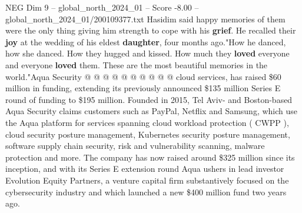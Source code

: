 \begin{textsample}{NEG Dim 9 – global\_north\_2024\_01 – Score -8.00 – global\_north\_2024\_01/200109377.txt}
Hasidim said happy memories of them were the only thing giving him strength to cope with his \textbf{grief}.
He recalled their \textbf{joy} at the wedding of his eldest \textbf{daughter}, four months ago."How he danced, how she danced.
How they hugged and kissed.
How much they \textbf{loved} everyone and everyone \textbf{loved} them.
These are the most beautiful memories in the world."Aqua Security @ @ @ @ @ @ @ @ @ @ cloud services, has raised \$60 million in funding, extending its previously announced \$135 million Series E round of funding to \$195 million.
Founded in 2015, Tel Aviv- and Boston-based Aqua Security claims customers such as PayPal, Netflix and Samsung, which use the Aqua platform for services spanning cloud workload protection ( CWPP ), cloud security posture management, Kubernetes security posture management, software supply chain security, risk and vulnerability scanning, malware protection and more.
The company has now raised around \$325 million since its inception, and with its Series E extension round Aqua ushers in lead investor Evolution Equity Partners, a venture capital firm substantively focused on the cybersecurity industry and which launched a new \$400 million fund two years ago.

\end{textsample}
